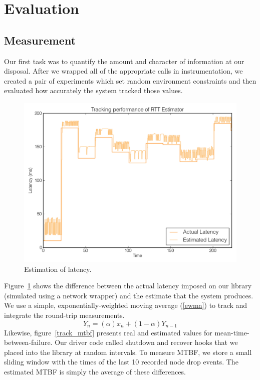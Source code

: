 
\section{Evaluation}\label{evaluation}

\subsection{Measurement}
Our first task was to quantify the amount and character of information at our disposal.
After we wrapped all of the appropriate calls in instrumentation, we created a pair of experiments which set random environment constraints and then evaluated how accurately the system tracked those values.

\begin{figure}[htbp]
\begin{center}
\includegraphics[width=\columnwidth]{track_rtt_final}
\caption{Estimation of latency.}
\label{track_rtt}
\end{center}
\end{figure}

Figure~\ref{track_rtt} shows the difference between the actual latency imposed on our library (simulated using a network wrapper) and the estimate that the system produces.
We use a simple, exponentially-weighted moving average (\ref{ewma}) to track and integrate the round-trip measurements.
\begin{equation}\label{ewma}
Y_n = (\alpha)x_n + (1-\alpha)Y_{n-1}
\end{equation}
Likewise, figure~\ref{track_mtbf} presents real and estimated values for mean-time-between-failure.
Our driver code called shutdown and recover hooks that we placed into the library at random intervals.
To measure MTBF, we store a small sliding window with the times of the last 10 recorded node drop events.
The estimated MTBF is simply the average of these differences.

